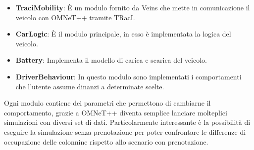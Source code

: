 \begin{itemize}
	\item \textbf{TraciMobility}: È un modulo fornito da Veins che mette in comunicazione il veicolo con OMNeT++ tramite TRacI.
	\item \textbf{CarLogic}: È il modulo principale, in esso è implementata la logica del veicolo. 
	\item \textbf{Battery}: Implementa il modello di carica e scarica del veicolo.
	\item \textbf{DriverBehaviour}: In questo modulo sono implementati i comportamenti che l'utente assume dinanzi a determinate scelte.  
\end{itemize}

Ogni modulo contiene dei parametri che permettono di cambiarne il comportamento, grazie a OMNeT++ diventa semplice lanciare molteplici simulazioni con diversi set di dati. Particolarmente interessante è la possibilità di eseguire la simulazione senza prenotazione per poter confrontare le differenze di occupazione delle colonnine rispetto allo scenario con prenotazione.

